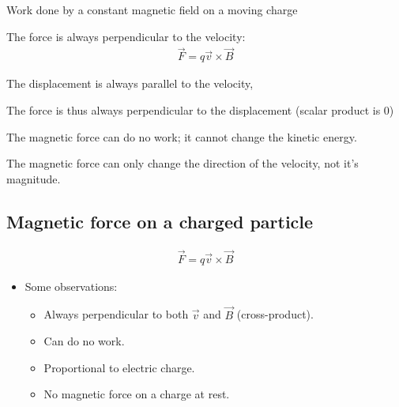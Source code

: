 \documentclass[aspectratio=169,
hyperref={colorlinks,urlcolor=blue}
]{beamer}
\begin{document}
\begin{bulletframe}{Work done by a constant magnetic field on a moving charge}
\item The force is always perpendicular to the velocity:
\begin{align*}
\vec F = q \vec v \times \vec B
\end{align*}
\item The displacement is always parallel to the velocity, 
\item The force is thus always perpendicular to the displacement (scalar product is 0)
\item[$\rightarrow$] The magnetic force can do no work; it cannot change the kinetic energy. 
\item[$\rightarrow$] The magnetic force can only change the direction of the velocity, not it’s magnitude.
\end{bulletframe}







\subsection{Magnetic force on a charged particle}
\label{subsec:magneticforceonachargedparticle}
{
\begin{align*}
\vec F = q \vec v \times \vec B
\end{align*}
\begin{itemize}
\item Some observations:
\begin{itemize}
\item Always perpendicular to both $\vec v$ and $\vec B$ (cross-product).
\item Can do no work.
\item Proportional to electric charge.
\item No magnetic force on a charge at rest.
\end{itemize}
\end{itemize}
}
{
}
\end{document}
